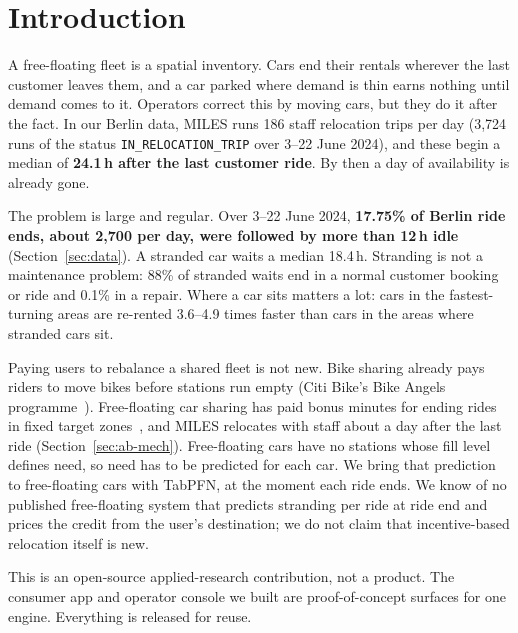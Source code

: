 \documentclass[11pt,a4paper]{article}
\begin{document}
\begin{abstract}
\end{abstract}

\section{Introduction}

A free-floating fleet is a spatial inventory. Cars end their rentals wherever the last customer leaves them, and a car parked where demand is thin earns nothing until demand comes to it. Operators correct this by moving cars, but they do it after the fact. In our Berlin data, MILES runs 186 staff relocation trips per day (3,724 runs of the status \texttt{IN\_RELOCATION\_TRIP} over 3--22 June 2024), and these begin a median of \textbf{24.1\,h after the last customer ride}. By then a day of availability is already gone.

The problem is large and regular. Over 3--22 June 2024, \textbf{17.75\% of Berlin ride ends, about 2,700 per day, were followed by more than 12\,h idle} (Section~\ref{sec:data}). %
A stranded car waits a median 18.4\,h. Stranding is not a maintenance problem: 88\% of stranded waits end in a normal customer booking or ride and 0.1\% in a repair. Where a car sits matters a lot: cars in the fastest-turning areas are re-rented 3.6--4.9 times faster than cars in the areas where stranded cars sit.

Paying users to rebalance a shared fleet is not new. Bike sharing already pays riders to move bikes before stations run empty (Citi Bike's Bike Angels programme~\citep{freund2019analytics}). Free-floating car sharing has paid bonus minutes for ending rides in fixed target zones~\citep{lippoldt2019cologne}, and MILES relocates with staff about a day after the last ride (Section~\ref{sec:ab-mech}). Free-floating cars have no stations whose fill level defines need, so need has to be predicted for each car. We bring that prediction to free-floating cars with TabPFN, at the moment each ride ends. We know of no published free-floating system that predicts stranding per ride at ride end and prices the credit from the user's destination; we do not claim that incentive-based relocation itself is new.

This is an open-source applied-research contribution, not a product. The consumer app and operator console we built are proof-of-concept surfaces for one engine. Everything is released for reuse.
\end{document}
